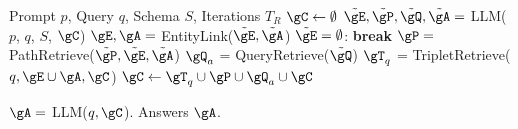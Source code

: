 \begin{algorithm}[t]
\centering
\caption{\byokg Framework.} \label{alg:refine}
\begin{algorithmic}[1]
    Prompt $p$, Query  $q$, Schema $S$, Iterations $T_R$
   \STATE $\gC \gets \emptyset$
   \STATE $\tilde{\gE}, \tilde{\gP}, \tilde{\gQ}, \tilde{\gA} = $ LLM($p$, $q$, $S$, $\gC$)
   \STATE $\gE, \gA = $ EntityLink($\tilde{\gE}, \tilde{\gA}$)
    $\tilde{\gE} = \emptyset$: {\bfseries break}
   \STATE $\gP = $ PathRetrieve($\tilde{\gP}, \tilde{\gE}, \tilde{\gA}$)
   \STATE $\gQ_a$ = QueryRetrieve($\tilde{\gQ}$)
   \STATE $\gT_q$ = TripletRetrieve($q, \gE \cup \gA, \gC$)
   \STATE $\gC \gets \gT_q \cup \gP \cup \gQ_a \cup \gC$
    
   \ENDFOR
   \STATE  $\gA  =$ LLM($q, \gC$).
    Answers $\gA$.
\end{algorithmic}
\end{algorithm}
